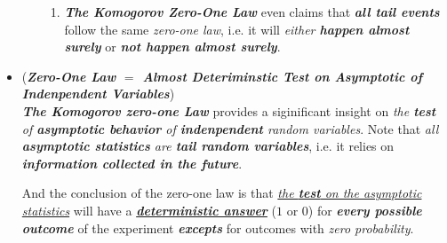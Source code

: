 \documentclass[11pt]{article}
\begin{document}
\begin{itemize}
\begin{remark}
\begin{enumerate}
\begin{enumerate}
\item \emph{\textbf{The Komogorov Zero-One Law}} even claims that \emph{\textbf{all tail events}} follow the same \emph{zero-one law}, i.e. it will \emph{either \textbf{happen almost surely}} or \emph{\textbf{not happen almost surely}}.
\end{enumerate}
\end{enumerate}
\end{remark}

\item \begin{remark} (\emph{\textbf{Zero-One Law $=$ Almost Deteriminstic Test on Asymptotic of Indenpendent Variables}})\\
\emph{\textbf{The Komogorov zero-one Law}} provides a siginificant insight on \emph{the \textbf{test} of \textbf{asymptotic behavior} of \textbf{indenpendent} random variables}. Note that \emph{all \textbf{asymptotic statistics} are \textbf{tail random variables}}, i.e. it relies on \emph{\textbf{information collected in the future}}. 

And the conclusion of the zero-one law is that \underline{\emph{the \textbf{test} on the asymptotic statistics}} will have a \underline{\emph{\textbf{deterministic answer}}} ($1$ or $0$) for \emph{\textbf{every possible outcome}} of the experiment \emph{\textbf{excepts}} for outcomes with \emph{zero probability}.
\end{remark}
\end{itemize}
\end{document}
